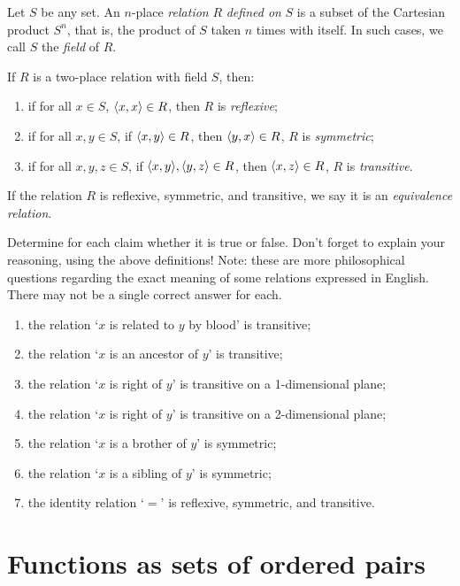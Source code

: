 \begin{defn} \label{refsymtran}
Let $S$ be any set. An $n$-place \textit{relation} $R$ \textit{defined on} $S$ is a subset of the Cartesian product $S^n$, that is, the product of $S$ taken $n$ times with itself. In such cases, we call $S$ the \textit{field} of $R$. 

If $R$ is a two-place relation with field $S$, then: 
\begin{enumerate}
	\item if for all $x \in S$, $\langle x, x\rangle \in R$, then $R$ is \textit{reflexive};
	\item if for all $x, y \in S$, if $\langle x, y\rangle \in R$, then $\langle y, x\rangle \in R$, $R$ is \textit{symmetric};
	\item if for all $x, y, z \in S$, if $\langle x, y\rangle, \langle y, z\rangle \in R$, then $\langle x, z\rangle \in R$, $R$ is \textit{transitive}. 
\end{enumerate}

If the relation $R$ is reflexive, symmetric, and transitive, we say it is an \textit{equivalence relation}.
\end{defn}

\begin{exc}
Determine for each claim whether it is true or false. Don't forget to explain your reasoning, using the above definitions! Note: these are more philosophical questions regarding the exact meaning of some relations expressed in English. There may not be a single correct answer for each. 

\begin{enumerate}
	\item the relation `$x$ is related to $y$ by blood' is transitive;
	\item the relation `$x$ is an ancestor of $y$' is transitive;
	\item the relation `$x$ is right of $y$' is transitive on a 1-dimensional plane;
	\item the relation `$x$ is right of $y$' is transitive on a 2-dimensional plane;
	\item the relation `$x$ is a brother of $y$' is symmetric;
	\item the relation `$x$ is a sibling of $y$' is symmetric;
	\item the identity relation `$=$' is reflexive, symmetric, and transitive. 
\end{enumerate}
\end{exc}

\section{Functions as sets of ordered pairs}

